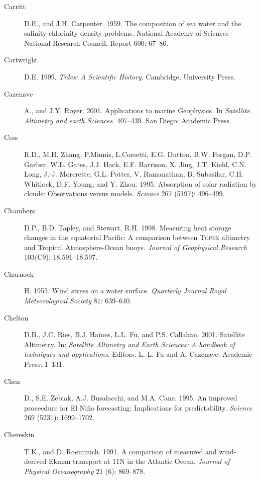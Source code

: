 \begin{description}
\item [Carritt]D.E., and J.H. Carpenter. 1959. The composition of sea water and
the salinity-chlorinity-density problems. National Academy of Sciences-National
Research Council, Report 600: 67--86.

\item [Cartwright]D.E. 1999. \textit{Tides: A Scientific History}. Cambridge,
University Press.
	
\item [Cazenave]A., and J.Y. Royer. 2001. Applications to marine Geophysics. In
\textit{Satellite Altimetry and earth Sciences}. 407--439. San Diego: Academic
Press.

\item [Cess]R.D., M.H. Zhang, P.Minnis, L.Corsetti, E.G. Dutton, B.W. Forgan,
D.P. Garber, W.L. Gates, J.J. Hack, E.F. Harrison, X. Jing, J.T. Kiehl, C.N.
Long, J.-J. Morcrette, G.L. Potter, V. Ramanathan, B. Subasilar, C.H. Whitlock,
D.F. Young, and Y. Zhou. 1995. Absorption of solar radiation by clouds:
Observations versus models. \textit{Science} 267 (5197): 496--499.

\item[Chambers]D.P., B.D. Tapley, and Stewart, R.H. 1998. Measuring heat storage changes in the equatorial Pacific: A comparison between \textsc{Topex} altimetry and Tropical Atmo\-sphere-Ocean buoys. \textit{Journal of Geophysical Research} 103(C9): 18,591--18,597.

\item [Charnock]H. 1955. Wind stress on a water surface. \textit{Quarterly
Journal Royal Meteorological Society} 81: 639--640.

\item [Chelton]D.B., J.C. Ries, B.J. Haines, L.L. Fu, and P.S. Callahan. 2001. Satellite Altimetry. In: \textit{Satellite Altimetry and Earth Sciences: A handbook of techniques and applications}. Editors: L.-L. Fu and A. Cazenave. Academic Press: 1--131.
	
\item [Chen]D., S.E. Zebiak, A.J. Busalacchi, and M.A. Cane. 1995. An improved
proceedure for El Ni\~{n}o forecasting: Implications for predictability.
\textit{Science} 269 (5231): 1699--1702.

\item [Chereskin]T.K., and D. Roemmich. 1991. A comparison of measured and
wind-derived Ekman transport at 11\degrees N in the Atlantic Ocean.
\textit{Journal of Physical Oceanography} 21 (6): 869--878.


\end{description}
